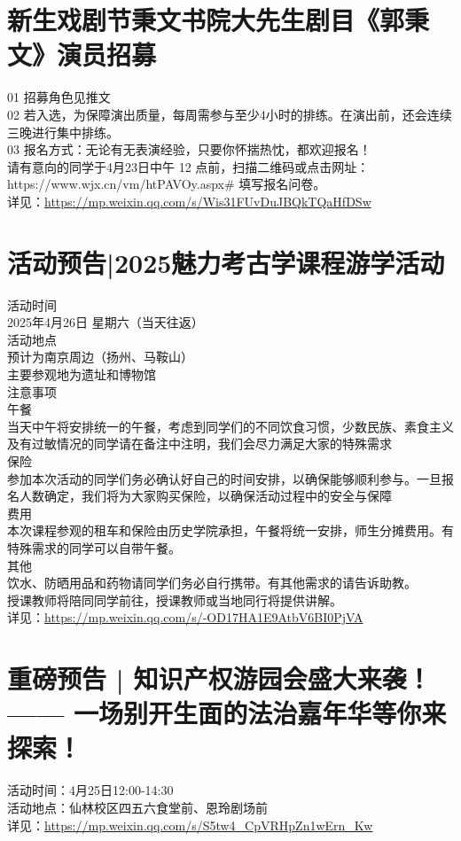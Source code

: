 \documentclass[letterpaper, 12pt]{article}
\begin{document}
\begin{multicols}{2}
\section{新生戏剧节秉文书院大先生剧目《郭秉文》演员招募} %
01 招募角色见推文
\\02 若入选，为保障演出质量，每周需参与至少4小时的排练。在演出前，还会连续三晚进行集中排练。
\\03 报名方式：无论有无表演经验，只要你怀揣热忱，都欢迎报名！
\\请有意向的同学于4月23日中午 12 点前，扫描二维码或点击网址：https://www.wjx.cn/vm/htPAVOy.aspx\# 填写报名问卷。
\\详见：\url{https://mp.weixin.qq.com/s/Wis31FUvDuJBQkTQaHfDSw}

\section{活动预告|2025魅力考古学课程游学活动} %
活动时间
\\2025年4月26日 星期六（当天往返）
\\活动地点
\\预计为南京周边（扬州、马鞍山）
\\主要参观地为遗址和博物馆
\\注意事项
\\午餐
\\当天中午将安排统一的午餐，考虑到同学们的不同饮食习惯，少数民族、素食主义及有过敏情况的同学请在备注中注明，我们会尽力满足大家的特殊需求
\\保险
\\参加本次活动的同学们务必确认好自己的时间安排，以确保能够顺利参与。一旦报名人数确定，我们将为大家购买保险，以确保活动过程中的安全与保障
\\费用
\\本次课程参观的租车和保险由历史学院承担，午餐将统一安排，师生分摊费用。有特殊需求的同学可以自带午餐。
\\其他
\\饮水、防晒用品和药物请同学们务必自行携带。有其他需求的请告诉助教。
\\授课教师将陪同同学前往，授课教师或当地同行将提供讲解。
\\详见：\url{https://mp.weixin.qq.com/s/-OD17HA1E9AtbV6BI0PjVA}

\section{重磅预告 | 知识产权游园会盛大来袭！—— 一场别开生面的法治嘉年华等你来探索！} %
活动时间：4月25日12:00-14:30
\\活动地点：仙林校区四五六食堂前、恩玲剧场前
\\详见：\url{https://mp.weixin.qq.com/s/S5tw4_CpVRHpZn1wErn_Kw}

\end{multicols}
\end{document}
